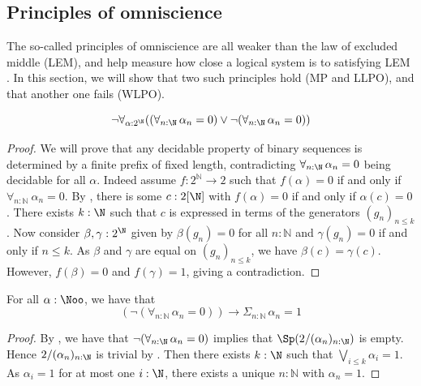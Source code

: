 \subsection{Principles of omniscience}
The so-called principles of omniscience are all weaker than the law of excluded middle (LEM), and help measure how close a logical system is to satisfying LEM \cite{HannesDiener, ReverseMathsBishop}.
In this section, we will show that two such principles hold (MP and LLPO), 
and that another one fails (WLPO).

\begin{theorem}\label{NotWLPO}
  \[
    \neg \forall_{\alpha:2^\N} 
    ((\forall_{n:\N}\, \alpha_n = 0 ) \vee \neg (\forall_{n:\N}\, \alpha_n = 0))
  \]
\end{theorem}
\begin{proof}
  We will prove that any decidable property of binary sequences is determined by a finite prefix of fixed length, contradicting $\forall_{n:\N}\, \alpha_n=0$ being decidable for all $\alpha$. 
  Indeed assume $f:2^\mathbb N \to 2$ such that 
  $f(\alpha) = 0$ if and only if $\forall_{n:\mathbb N}\ \alpha_n= 0$. 
  By , there is some $c:2[\N]$ with 
  $f(\alpha) = 0$ if and only if $\alpha(c) = 0$. 
  There exists $k:\N$ such that $c$ is expressed in terms of the generators $(g_n)_{n\leq k}$. 
  Now consider $\beta,\gamma:2^\N$ given by 
  $\beta(g_n) = 0$ for all $n:\mathbb N$ and
  $\gamma(g_n) = 0$ if and only if $n\leq k$. 
  As $\beta$ and $\gamma$ are equal on $(g_n)_{n\leq k}$, we have $\beta(c) = \gamma(c)$. 
  However, $f(\beta) = 0$ and $f(\gamma) = 1$, giving a contradiction. 
\end{proof}

\begin{theorem}
  For all $\alpha:\Noo$, we have that 
  \[
    (\neg (\forall_{n:\mathbb N}\, \alpha_n= 0)) \to \Sigma_{n:\mathbb N}\, \alpha_n= 1
  \]
\end{theorem}
\begin{proof}
  By , we have that $\neg(\forall_{n:\N}\, \alpha_n = 0)$ implies that 
  $\Sp(2/(\alpha_n)_{n:\N})$ is empty. 
  Hence $2/(\alpha_n)_{n:\N}$ is trivial by . 
  Then there exists $k:\N$ such that $\bigvee_{i\leq k} \alpha_i = 1$. 
  As $\alpha_i = 1$ for at most one $i:\N$, 
  there exists a unique $n:\mathbb N$ with $\alpha_n = 1$. 
\end{proof}

